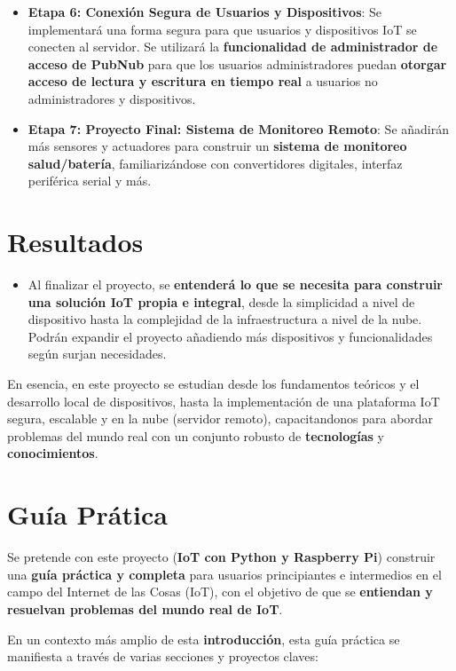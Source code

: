 \documentclass{report}
\begin{document}
\begin{itemize}
        \item \textbf{Etapa 6: Conexión Segura de Usuarios y Dispositivos}: Se implementará una forma segura para que usuarios y dispositivos IoT se 
              conecten al servidor. Se utilizará la \textbf{funcionalidad de administrador de acceso de PubNub} para que los usuarios administradores 
              puedan \textbf{otorgar acceso de lectura y escritura en tiempo real} a usuarios no administradores y dispositivos.
        \item \textbf{Etapa 7: Proyecto Final: Sistema de Monitoreo Remoto}: Se añadirán más sensores y actuadores para construir un 
              \textbf{sistema de monitoreo salud/batería}, familiarizándose con convertidores digitales, interfaz periférica serial y más.
    \end{itemize}

\section{Resultados}
    \begin{itemize}
        \item Al finalizar el proyecto, se \textbf{entenderá lo que se necesita para construir una solución IoT propia e integral}, desde la 
        simplicidad a nivel de dispositivo hasta la complejidad de la infraestructura a nivel de la nube. Podrán expandir el proyecto añadiendo más 
        dispositivos y funcionalidades según surjan necesidades.
    \end{itemize}

En esencia, en este proyecto se estudian desde los fundamentos teóricos y el desarrollo local de dispositivos, hasta 
la implementación de una plataforma IoT segura, escalable y en la nube (servidor remoto), capacitandonos para abordar problemas del mundo real con un
conjunto robusto de \textbf{tecnologías} y \textbf{conocimientos}.

\newpage

\section{Guía Prática}
Se pretende con este proyecto (\textbf{IoT con Python y Raspberry Pi}) construir una \textbf{guía práctica y completa} 
para usuarios principiantes e intermedios en el campo del Internet de las Cosas (IoT), con 
el objetivo de que se \textbf{entiendan y resuelvan problemas del mundo real de IoT}.

En un contexto más amplio de esta \textbf{introducción}, esta guía práctica se manifiesta a través de varias secciones 
y proyectos claves:
\end{document}
